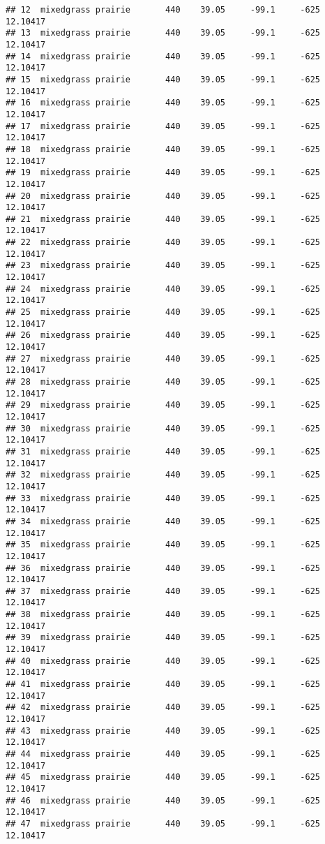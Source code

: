 \documentclass[]{article}
\begin{document}
\begin{verbatim}
## 12  mixedgrass prairie       440    39.05     -99.1     -625 12.10417
## 13  mixedgrass prairie       440    39.05     -99.1     -625 12.10417
## 14  mixedgrass prairie       440    39.05     -99.1     -625 12.10417
## 15  mixedgrass prairie       440    39.05     -99.1     -625 12.10417
## 16  mixedgrass prairie       440    39.05     -99.1     -625 12.10417
## 17  mixedgrass prairie       440    39.05     -99.1     -625 12.10417
## 18  mixedgrass prairie       440    39.05     -99.1     -625 12.10417
## 19  mixedgrass prairie       440    39.05     -99.1     -625 12.10417
## 20  mixedgrass prairie       440    39.05     -99.1     -625 12.10417
## 21  mixedgrass prairie       440    39.05     -99.1     -625 12.10417
## 22  mixedgrass prairie       440    39.05     -99.1     -625 12.10417
## 23  mixedgrass prairie       440    39.05     -99.1     -625 12.10417
## 24  mixedgrass prairie       440    39.05     -99.1     -625 12.10417
## 25  mixedgrass prairie       440    39.05     -99.1     -625 12.10417
## 26  mixedgrass prairie       440    39.05     -99.1     -625 12.10417
## 27  mixedgrass prairie       440    39.05     -99.1     -625 12.10417
## 28  mixedgrass prairie       440    39.05     -99.1     -625 12.10417
## 29  mixedgrass prairie       440    39.05     -99.1     -625 12.10417
## 30  mixedgrass prairie       440    39.05     -99.1     -625 12.10417
## 31  mixedgrass prairie       440    39.05     -99.1     -625 12.10417
## 32  mixedgrass prairie       440    39.05     -99.1     -625 12.10417
## 33  mixedgrass prairie       440    39.05     -99.1     -625 12.10417
## 34  mixedgrass prairie       440    39.05     -99.1     -625 12.10417
## 35  mixedgrass prairie       440    39.05     -99.1     -625 12.10417
## 36  mixedgrass prairie       440    39.05     -99.1     -625 12.10417
## 37  mixedgrass prairie       440    39.05     -99.1     -625 12.10417
## 38  mixedgrass prairie       440    39.05     -99.1     -625 12.10417
## 39  mixedgrass prairie       440    39.05     -99.1     -625 12.10417
## 40  mixedgrass prairie       440    39.05     -99.1     -625 12.10417
## 41  mixedgrass prairie       440    39.05     -99.1     -625 12.10417
## 42  mixedgrass prairie       440    39.05     -99.1     -625 12.10417
## 43  mixedgrass prairie       440    39.05     -99.1     -625 12.10417
## 44  mixedgrass prairie       440    39.05     -99.1     -625 12.10417
## 45  mixedgrass prairie       440    39.05     -99.1     -625 12.10417
## 46  mixedgrass prairie       440    39.05     -99.1     -625 12.10417
## 47  mixedgrass prairie       440    39.05     -99.1     -625 12.10417

\end{verbatim}
\end{document}

